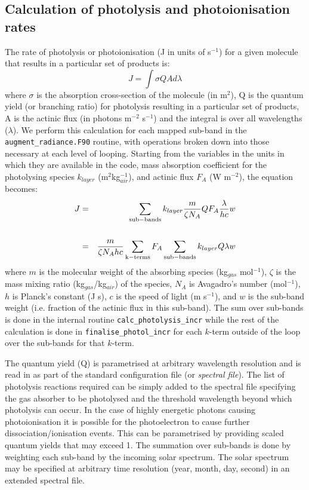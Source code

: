 \subsection{Calculation of photolysis and photoionisation rates}
The rate of photolysis or photoionisation (J in units of s$^{-1}$) for a given molecule that results in a particular set of products is:
\begin{equation}
J = \int \sigma Q A d\lambda
\end{equation}
where $\sigma$ is the absorption cross-section of the molecule (in m$^2$), Q is the quantum yield (or branching ratio)
for photolysis resulting in a particular set of products, A is the actinic flux (in photons m$^{-2}$ s$^{-1}$) and the
integral is over all wavelengths ($\lambda$). We perform this calculation for each mapped sub-band in the
{\tt augment\_radiance.F90} routine, with operations broken down into those necessary at each level of looping.
Starting from the variables in the units in which they are available in the code, mass absorption coefficient for the photolysing species $k_{layer}$ (m$^2$kg$^{-1}_{air}$), and actinic flux $F_A$ (W m$^{-2}$), the equation becomes:
\begin{eqnarray}
J & = & \sum_{\rm sub-bands} k_{layer} \frac{m}{\zeta N_A} Q F_A \frac{\lambda}{h c} w \label{eqn:j_sub-band} \\
  && \nonumber \\
  & = & \frac{m}{\zeta N_A h c} \sum_{\rm k-terms} F_A \sum_{\rm sub-bands} k_{layer} Q \lambda w \label{eqn:j_sub-band2}
\end{eqnarray}
where $m$ is the molecular weight of the absorbing species (kg$_{gas}$ mol$^{-1}$), $\zeta$ is the mass mixing ratio (kg$_{gas}$/kg$_{air}$) of the species,
$N_A$ is Avagadro's number (mol$^{-1}$), $h$ is Planck's constant (J s), $c$ is the speed of light (m s$^{-1}$), and $w$ is the sub-band weight (i.e. fraction of the actinic flux in this sub-band). The sum over sub-bands is done in the internal routine {\tt calc\_photolysis\_incr} while the rest of the calculation is done in {\tt finalise\_photol\_incr} for each $k$-term outside of the loop over the sub-bands for that $k$-term.

The quantum yield (Q) is parametrised at arbitrary wavelength resolution and is read in as part of the
standard configuration file (or {\em spectral file}). The list of photolysis reactions required can be simply added
to the spectral file specifying the gas absorber to be photolysed and the threshold wavelength beyond
which photolysis can occur. In the case of highly energetic photons causing photoionisation it is possible for
the photoelectron to cause further dissociation/ionisation events. This can be parametrised by providing scaled
quantum yields that may exceed 1.
The summation over sub-bands is done by weighting each sub-band by the incoming solar spectrum. The solar
spectrum may be specified at arbitrary time resolution (year, month, day, second) in an extended spectral
file.

